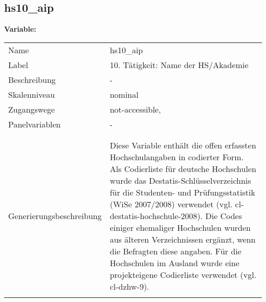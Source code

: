 	
	
	\subsection{hs10\_aip}
	\label{subSection:hs10_aip}

	\noindent\textbf{Variable:}\\
		\begin{tabular}{lL{11.3cm}}
			\label{tableVariable:hs10_aip}
			Name & hs10\_aip \\
			Label & 10. Tätigkeit: Name der HS/Akademie \\
			Beschreibung & - \\
			Skalenniveau & nominal \\
			Zugangswege &
				not-accessible,
 \\
			Panelvariablen & -
			 \\
			 \\
 \\
					Generierungsbeschreibung & Diese Variable enthält die offen erfassten Hochschulangaben in codierter Form. Als Codierliste für deutsche Hochschulen wurde das Destatis-Schlüsselverzeichnis für die Studenten- und Prüfungsstatistik (WiSe 2007/2008) verwendet (vgl. cl-destatis-hochschule-2008). Die Codes einiger ehemaliger Hochschulen wurden aus älteren Verzeichnissen ergänzt, wenn die Befragten diese angaben. Für die Hochschulen  im Ausland wurde eine projekteigene Codierliste verwendet (vgl. cl-dzhw-9). 
				 \\	
			 \\
		\end{tabular}






	
	\newpage
